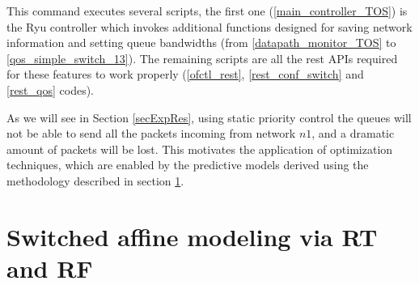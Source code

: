 This command executes several scripts, the first one (\ref{main_controller_TOS}) is the Ryu controller which invokes additional functions designed for saving network information and setting queue bandwidths (from \ref{datapath_monitor_TOS} to \ref{qos_simple_switch_13}). The remaining scripts are all the rest APIs required for these features to work properly (\ref{ofctl_rest}, \ref{rest_conf_switch} and \ref{rest_qos} codes).

As we will see in Section \ref{secExpRes}, using static priority control the queues will not be able to send all the packets incoming from network $n1$, and a dramatic amount of packets will be lost. This motivates the application of optimization techniques, which are enabled by the predictive models derived using the methodology described in section \ref{secSwitchedModeling}.

\section{Switched affine modeling via RT and RF}\label{secSwitchedModeling}

